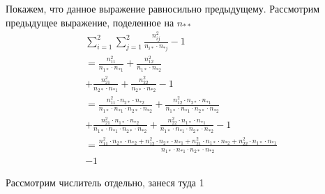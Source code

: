 \documentclass{article}
\begin{document}
    Покажем, что данное выражение равносильно предыдущему.
    Рассмотрим предыдущее выражение, поделенное на $n_{**}$
    \[
    \begin{gathered}
        \sum_{i=1}^{2}{\sum_{j=1}^{2}{  \frac{n_{ij}^{2} }{ n_{i*} \cdot n_{*j} }  }} - 1 \\
        = \frac{n_{11}^{2} }{n_{1*} \cdot n_{*1}} + \frac{n_{12}^{2} }{n_{1*} \cdot n_{*2}} \\
        + \frac{n_{21}^{2} }{n_{2*} \cdot n_{*1}} + \frac{n_{22}^{2} }{n_{2*} \cdot n_{*2}} - 1 \\
        = \frac{ n_{11}^{2} \cdot n_{2*} \cdot n_{*2} }{n_{1*} \cdot n_{*1} \cdot n_{2*} \cdot n_{*2}} +
        \frac{n_{12}^{2} \cdot n_{2*} \cdot n_{*1} }{n_{1*} \cdot n_{*1} \cdot n_{2*} \cdot n_{*2}} \\
        + \frac{n_{21}^{2} \cdot n_{1*} \cdot n_{*2} }{n_{1*} \cdot n_{*1} \cdot n_{2*} \cdot n_{*2}} +
        \frac{n_{22}^{2} \cdot n_{1*} \cdot n_{*1} }{n_{1*} \cdot n_{*1} \cdot n_{2*} \cdot n_{*2}} - 1 \\
        = \frac{n_{11}^{2} \cdot n_{2*} \cdot n_{*2} + n_{12}^{2} \cdot n_{2*} \cdot n_{*1} + n_{21}^{2} \cdot n_{1*} \cdot n_{*2} + n_{22}^{2} \cdot n_{1*} \cdot n_{*1}}
        {n_{1*} \cdot n_{*1} \cdot n_{2*} \cdot n_{*2}} \\ - 1
    \end{gathered}
    \]

    Рассмотрим числитель отдельно, занеся туда 1
\end{document}
